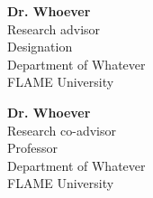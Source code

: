 \vspace{-\parskip}
\begingroup
\singlespacing
\begin{flushright}
\textbf{Dr. Whoever}    \\
Research advisor        \\
Designation               \\
Department of Whatever  \\
FLAME University              \\

\par
\vspace{3\parskip}

\textbf{Dr. Whoever}    \\
Research co-advisor     \\
Professor               \\
Department of Whatever  \\
FLAME University           \\
\end{flushright}
\endgroup
\par
